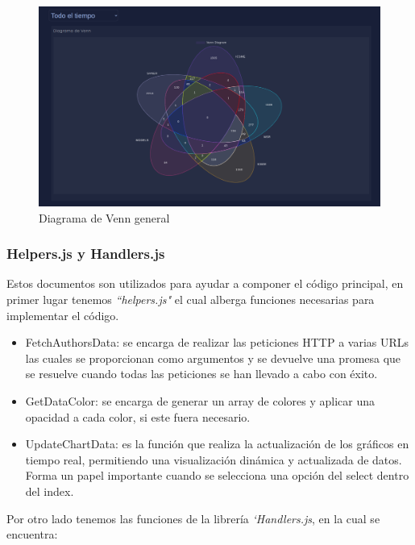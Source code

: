 \documentclass[a4paper, 12pt]{book}
\begin{document}
\begin{figure}[h]
  \centering
  \includegraphics[width=17cm, keepaspectratio]{img/venn_graph_T.png}
  \caption{Diagrama de Venn general}
  \label{fig:venn_graph_t}
\end{figure}

\subsubsection{Helpers.js y Handlers.js}

Estos documentos son utilizados para ayudar a componer el código principal, en primer lugar tenemos \textit{``helpers.js"} el cual alberga funciones necesarias para implementar el código.

\begin{itemize}
    \item FetchAuthorsData: se encarga de realizar las peticiones HTTP a varias URLs las cuales se proporcionan como argumentos y se devuelve una promesa que se resuelve cuando todas las peticiones se han llevado a cabo con éxito.
    \item GetDataColor: se encarga de generar un array de colores y aplicar una opacidad a cada color, si este fuera necesario.
    \item UpdateChartData: es la función que realiza la actualización de los gráficos en tiempo real, permitiendo una visualización dinámica y actualizada de datos. Forma un papel importante cuando se selecciona una opción del select dentro del index.
\end{itemize}
Por otro lado tenemos las funciones de la librería \textit{`Handlers.js}, en la cual se encuentra:
\end{document}
